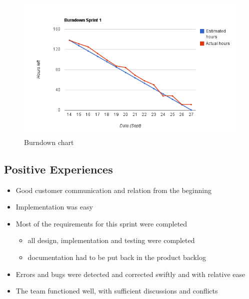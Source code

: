 \begin{figure}[!htb]
	\includegraphics[width=\textwidth]{./sprints/img/burndown_chart_s1}
	\caption{Burndown chart\label{fig:sp1:burndown}}
\end{figure}

\subsection{Positive Experiences}
\begin{itemize}
	\item Good customer communication and relation from the beginning
	\item Implementation was easy
	\item Most of the requirements for this sprint were completed
	\begin{itemize} 
		\item all design, implementation and testing were completed
		\item documentation had to be put back in the product backlog 
	\end{itemize}
	\item Errors and bugs were detected and corrected swiftly and with relative ease
	\item The team functioned well, with sufficient discussions and conflicts
\end{itemize}

